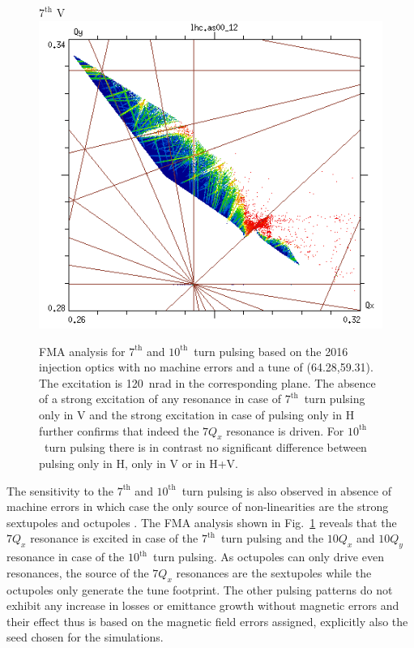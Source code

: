 \documentclass[%
 reprint,
 amsmath,amssymb,
 aps,
prstab,
]{revtex4-1}
\begin{document}
\begin{figure}[h]
\begin{minipage}[t]{0.49\linewidth}
		\centering
		$7^{\mathrm{th}}$ V
		\includegraphics[width=1.0\linewidth]{2016injnocolc15o+19_6noerrut7skv_dp0_ord7.png}
	\end{minipage}
	\caption{\label{fig:patternfma} FMA analysis for $7^{\mathrm{th}}$ and $10^{\mathrm{th}}$~turn pulsing based on the 2016 injection optics with no machine errors and a tune of (64.28,59.31). The excitation is 120~nrad in the corresponding plane. The absence of a strong excitation of any resonance in case of $7^{\mathrm{th}}$~turn pulsing only in V and the strong excitation in case of pulsing only in H further confirms that indeed the $7Q_x$ resonance is driven. For $10^{\mathrm{th}}$~turn pulsing there is in contrast no significant difference between pulsing only in H, only in V or in H+V.}
\end{figure}
The sensitivity to the $7^{\mathrm{th}}$ and $10^{\mathrm{th}}$~turn pulsing is also observed in absence of machine errors in which case the only source of non-linearities are the strong sextupoles and octupoles \cite{md_sim_hel_res_ex_fitterer}. The FMA analysis shown in Fig.~\ref{fig:patternfma} reveals that 
the $7Q_x$ resonance is excited in case of the $7^{\mathrm{th}}$~turn pulsing and the $10Q_x$ and $10Q_y$ resonance in case of the $10^{\mathrm{th}}$~turn pulsing. As octupoles can only drive even resonances, the source of the $7Q_x$ resonances are the sextupoles while the octupoles only generate the tune footprint. The other pulsing patterns do not exhibit any increase in losses or emittance growth without magnetic errors and their effect thus is based on the magnetic field errors assigned, explicitly also the seed chosen for the simulations.
\end{document}
